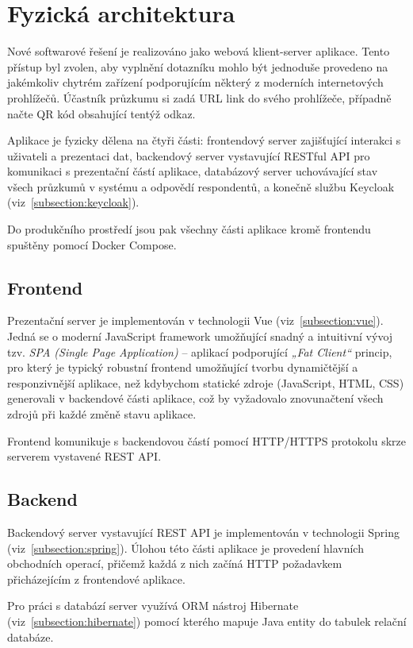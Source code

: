 \section{Fyzická architektura}
Nové softwarové řešení je realizováno jako webová klient-server aplikace. 
Tento přístup byl zvolen, aby vyplnění dotazníku mohlo být jednoduše provedeno na 
jakémkoliv chytrém zařízení podporujícím některý z moderních internetových prohlížečů. 
Účastník průzkumu si zadá URL link do svého prohlížeče, případně načte QR kód obsahující
tentýž odkaz.

Aplikace je fyzicky dělena na čtyři části: frontendový server zajišťující interakci s 
uživateli a prezentaci dat, backendový server vystavující RESTful API pro komunikaci s 
prezentační částí aplikace, databázový server uchovávající stav všech průzkumů 
v systému a odpovědí respondentů, a konečně službu Keycloak (viz~\ref{subsection:keycloak}).

Do produkčního prostředí jsou pak všechny části aplikace kromě frontendu spuštěny pomocí Docker Compose.

\subsection{Frontend}
Prezentační server je implementován v technologii Vue (viz~\ref{subsection:vue}). Jedná se o moderní JavaScript framework umožňující snadný a intuitivní vývoj tzv. \textit{SPA (Single Page Application)} –  aplikací podporující \textit{„Fat Client“} princip, pro který je typický robustní frontend umožňující tvorbu dynamičtější a responzivnější aplikace, než kdybychom statické zdroje (JavaScript, HTML, CSS) generovali v backendové části aplikace, což by vyžadovalo znovunačtení všech zdrojů při každé změně stavu aplikace. 

Frontend komunikuje s backendovou částí pomocí HTTP/HTTPS protokolu skrze serverem vystavené REST API.

\subsection{Backend}
Backendový server vystavující REST API je implementován v technologii Spring (viz~\ref{subsection:spring}). 
Úlohou této části aplikace je provedení hlavních obchodních operací, přičemž každá z nich
začíná HTTP požadavkem přicházejícím z frontendové aplikace.

Pro práci s databází server využívá ORM nástroj Hibernate (viz~\ref{subsection:hibernate}) pomocí kterého
mapuje Java entity do tabulek relační databáze.

